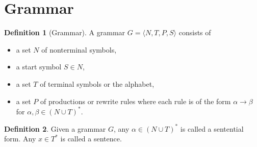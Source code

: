 \documentclass[a4paper]{scrartcl}
\theoremstyle{definition}
\newtheorem{definition}{Definition}
\begin{document}
\section{Grammar}
\begin{definition}[Grammar]
A grammar $G = \langle N, T, P, S\rangle$ consists of
\begin{itemize}
	\item a set $N$ of nonterminal symbols,
	\item a start symbol $S \in N$,
	\item a set $T$ of terminal symbols or the alphabet,
	\item a set $P$ of productions or rewrite rules where each rule is of the form $\alpha \to \beta$ for $\alpha, \beta \in (N \cup T)^*$.
\end{itemize}
\end{definition}
\begin{definition}
	Given a grammar $G$, any $\alpha \in (N\cup T)^*$ is called a sentential form. Any $x \in T^*$ is called a sentence.
\end{definition}
\end{document}

